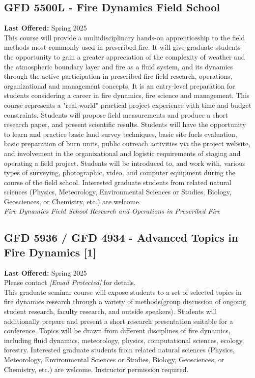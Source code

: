 \documentclass[12pt,a4paper]{article}
\begin{document}
\subsection{GFD 5500L - Fire Dynamics Field School}
\textbf{Last Offered:} Spring 2025 \\
This course will provide a multidisciplinary hands-on apprenticeship to the field methods most commonly used in prescribed fire. It will give graduate students the opportunity to gain a greater appreciation of the complexity of weather and the atmospheric boundary layer and fire as a fluid system, and its dynamics through the active participation in prescribed fire field research, operations, organizational and management concepts. It is an entry-level preparation for students considering a career in fire dynamics, fire science and management. This course represents a "real-world" practical project experience with time and budget constraints. Students will propose field measurements and produce a short research paper, and present scientific results. Students will have the opportunity to learn and practice basic land survey techniques, basic site fuels evaluation, basic preparation of burn units, public outreach activities via the project website, and involvement in the organizational and logistic requirements of staging and operating a field project. Students will be introduced to, and work with, various types of surveying, photographic, video, and computer equipment during the course of the field school. Interested graduate students from related natural sciences (Physics, Meteorology, Environmental Sciences or Studies, Biology, Geosciences, or Chemistry, etc.) are welcome. \\
\textit{Fire Dynamics Field School Research and Operations in Prescribed Fire}

\subsection{GFD 5936 / GFD 4934 - Advanced Topics in Fire Dynamics [1]}
\textbf{Last Offered:} Spring 2025 \\
Please contact \textit{[Email Protected]} for details. \\
This graduate seminar course will expose students to a set of selected topics in fire dynamics research through a variety of methods(group discussion of ongoing student research, faculty research, and outside speakers). Students will additionally prepare and present a short research presentation suitable for a conference. Topics will be drawn from different disciplines of fire dynamics, including fluid dynamics, meteorology, physics, computational sciences, ecology, forestry. Interested graduate students from related natural sciences (Physics, Meteorology, Environmental Sciences or Studies, Biology, Geosciences, or Chemistry, etc.) are welcome. Instructor permission required.
\end{document}
